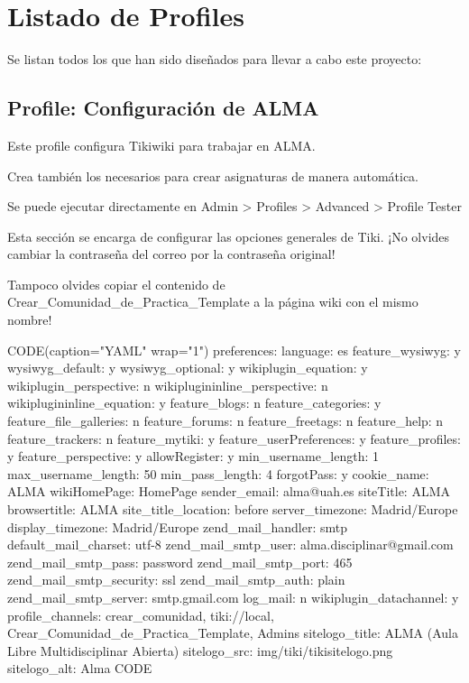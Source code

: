 \section{Listado de Profiles}

Se listan todos los \profiles{} que han sido diseñados para llevar a cabo este proyecto:

\subsection{Profile: Configuración de ALMA}
\label{section:configuracion_alma}

\begin{pyglist}[language=text]
Este profile configura Tikiwiki para trabajar en ALMA.

Crea también los \profiles{} necesarios para crear asignaturas de manera automática.

Se puede ejecutar directamente en Admin > Profiles > Advanced > Profile Tester

Esta sección se encarga de configurar las opciones generales de Tiki. ¡No olvides 
cambiar la contraseña del correo por la contraseña original!

Tampoco olvides copiar el contenido de Crear_Comunidad_de_Practica_Template 
a la página wiki con el mismo nombre!

{CODE(caption="YAML" wrap="1")}
preferences:
  language: es
  feature_wysiwyg:  y
  wysiwyg_default: y
  wysiwyg_optional: y
  wikiplugin_equation: y
  wikiplugin_perspective: n
  wikiplugininline_perspective: n
  wikiplugininline_equation: y
  feature_blogs:  n
  feature_categories:  y
  feature_file_galleries:  n
  feature_forums:  n
  feature_freetags:  n
  feature_help:  n
  feature_trackers:  n
  feature_mytiki:  y
  feature_userPreferences:  y
  feature_profiles: y
  feature_perspective: y
  allowRegister:  y
  min_username_length:  1
  max_username_length:  50
  min_pass_length:  4  
  forgotPass:  y
  cookie_name:  ALMA
  wikiHomePage:  HomePage
  sender_email:  alma@uah.es
  siteTitle:  ALMA
  browsertitle: ALMA
  site_title_location: before
  server_timezone: Madrid/Europe
  display_timezone: Madrid/Europe
  zend_mail_handler: smtp
  default_mail_charset: utf-8
  zend_mail_smtp_user: alma.disciplinar@gmail.com
  zend_mail_smtp_pass: password
  zend_mail_smtp_port: 465
  zend_mail_smtp_security: ssl
  zend_mail_smtp_auth: plain
  zend_mail_smtp_server: smtp.gmail.com
  log_mail: n
  wikiplugin_datachannel: y
  profile_channels: crear_comunidad, tiki://local, Crear_Comunidad_de_Practica_Template, Admins
  sitelogo_title: ALMA (Aula Libre Multidisciplinar Abierta)
  sitelogo_src: img/tiki/tikisitelogo.png
  sitelogo_alt: Alma
{CODE}


\end{pyglist}
